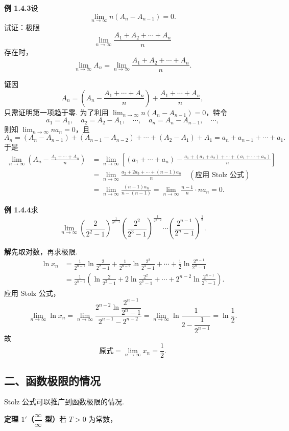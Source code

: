 \documentclass[UTF8,12pt,a4paper,fontset=fandol]{ctexart}
\begin{document}
\noindent\textbf{例 1.4.3}\quad 设
\[
  \lim_{n\to\infty}n(A_n-A_{n-1})=0.
\]
试证：极限
\[
  \lim_{n\to\infty}\frac{A_1+A_2+\cdots+A_n}{n}
\]
存在时，
\[
  \lim_{n\to\infty}A_n
  =\lim_{n\to\infty}\frac{A_1+A_2+\cdots+A_n}{n}.
\]

\noindent\textbf{证}\quad 因
\[
  A_n=\left(A_n-\frac{A_1+\cdots+A_n}{n}\right)+
  \frac{A_1+\cdots+A_n}{n},
\]
只需证明第一项趋于零. 为了利用 $\displaystyle\lim_{n\to\infty}n(A_n-A_{n-1})=0$，特令
\[
  a_1=A_1,\quad a_2=A_2-A_1,\quad\cdots,\quad
  a_n=A_n-A_{n-1},\quad\cdots,
\]
则知 $\displaystyle\lim_{n\to\infty}na_n=0$，且
\[
  A_n=(A_n-A_{n-1})+(A_{n-1}-A_{n-2})+\cdots+(A_2-A_1)+A_1
  =a_n+a_{n-1}+\cdots+a_1.
\]
于是
\[
\begin{aligned}
  \lim_{n\to\infty}\left(A_n-\frac{A_1+\cdots+A_n}{n}\right)
  &=\lim_{n\to\infty}\left[(a_1+\cdots+a_n)-
  \frac{a_1+(a_1+a_2)+\cdots+(a_1+\cdots+a_n)}n\right]\\
  &=\lim_{n\to\infty}\frac{a_2+2a_3+\cdots+(n-1)a_n}{n}
  \quad(\text{应用 Stolz 公式})\\
  &=\lim_{n\to\infty}\frac{(n-1)a_n}{n-(n-1)}
  =\lim_{n\to\infty}\frac{n-1}{n}\cdot na_n=0.
\end{aligned}
\]

\noindent\textbf{例 1.4.4}\quad 求
\[
  \lim_{n\to\infty}
  \left(\frac2{2^2-1}\right)^{\frac1{2^{n-1}}}
  \left(\frac{2^2}{2^3-1}\right)^{\frac1{2^{n-2}}}
  \cdots
  \left(\frac{2^{n-1}}{2^n-1}\right)^{\frac12}.
\]

\noindent\textbf{解}\quad 先取对数，再求极限.
\[
\begin{aligned}
  \ln x_n
  &=\frac1{2^{n-1}}\ln\frac2{2^2-1}
  +\frac1{2^{n-2}}\ln\frac{2^2}{2^3-1}
  +\cdots+\frac12\ln\frac{2^{n-1}}{2^n-1}\\
  &=\frac1{2^{n-1}}\left(\ln\frac2{2^2-1}
  +2\ln\frac{2^2}{2^3-1}
  +\cdots+2^{n-2}\ln\frac{2^{n-1}}{2^n-1}\right).
\end{aligned}
\]
应用 Stolz 公式，
\[
  \lim_{n\to\infty}\ln x_n
  =\lim_{n\to\infty}
  \frac{2^{n-2}\ln\dfrac{2^{n-1}}{2^n-1}}{2^{n-1}-2^{n-2}}
  =\lim_{n\to\infty}\ln\frac1{2-\dfrac1{2^{n-1}}}
  =\ln\frac12.
\]
故
\[
  \text{原式}=\lim_{n\to\infty}x_n=\frac12.
\]

\subsection*{二、函数极限的情况}

Stolz 公式可以推广到函数极限的情况.

\noindent\textbf{定理 $1'$（$\dfrac\infty\infty$ 型）}\quad 若 $T>0$ 为常数，
\end{document}
